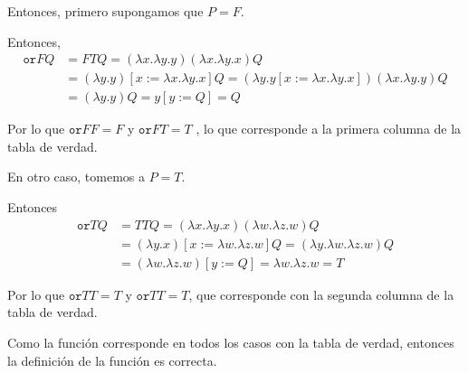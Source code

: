 \documentclass{article}
\begin{document}
\begin{enumerate}
{\begin{itemize}
{\begin{itemize}
{                            Entonces, primero supongamos que 
                            $P = F$.

                            Entonces, 
                            \begin{align*}
                                \texttt{or} F Q &= F T Q
                                = (\lambda x. \lambda y. y)
                                (\lambda x. \lambda y. x)
                                Q \\
                                &= (\lambda y. y)
                                [x:=\lambda x. \lambda y. x]
                                Q
                                =(\lambda y. y[x:=\lambda x. \lambda y. x])
                                (\lambda x. \lambda y. y) Q \\
                                &= (\lambda y. y) Q = y[y := Q] = Q
                            \end{align*}

                            Por lo que $\texttt{or}FF = F$ y $\texttt{or}FT = T$
                            , lo que corresponde a la primera columna de la
                            tabla de verdad.

                            En otro caso, tomemos a $P = T$.

                            Entonces
                            \begin{align*}
                                \texttt{or} T Q &= T T Q
                                = (\lambda x. \lambda y. x)
                                (\lambda w. \lambda z. w)
                                Q \\
                                &= (\lambda y. x)
                                [x:=\lambda w. \lambda z. w]
                                Q
                                =(\lambda y. \lambda w. \lambda z. w) Q \\
                                &= (\lambda w. \lambda z. w) [y := Q] 
                                = \lambda w. \lambda z. w = T
                            \end{align*}

                            Por lo que $\texttt{or}TT = T$ y $\texttt{or}TT = T$,
                            que corresponde con la segunda columna de la tabla
                            de verdad.

                            Como la función corresponde en todos los casos con
                            la tabla de verdad, entonces la definición de la 
                            función es correcta.


}
\end{itemize}}
\end{itemize}}
\end{enumerate}
\end{document}
